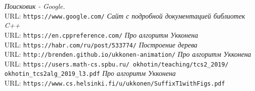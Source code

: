 \begin{thebibliography}{99}
{\itshape Поисковик - Google.} \\URL: \texttt{https://www.google.com/}
{\itshape Сайт с подробной документацией библиотек C++} \\URL: \texttt{https://en.cppreference.com/}
{\itshape Про алгоритм Укконена} \\URL: \texttt{https://habr.com/ru/post/533774/}
{\itshape Построение дерева} \\URL: \texttt{http://brenden.github.io/ukkonen-animation/}
{\itshape Про алгоритм Укконена} \\URL: \texttt{https://users.math-cs.spbu.ru/~okhotin/teaching/tcs2\_2019/ okhotin\_tcs2alg\_2019\_l3.pdf}
{\itshape Про алгоритм Укконена} \\URL: \texttt{https://www.cs.helsinki.fi/u/ukkonen/SuffixT1withFigs.pdf}
\end{thebibliography}
\pagebreak
